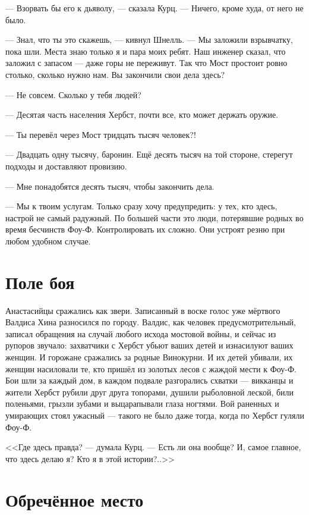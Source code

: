 --- Взорвать бы его к дьяволу, --- сказала Курц.
--- Ничего, кроме худа, от него не было.

--- Знал, что ты это скажешь, --- кивнул Шнелль.
--- Мы заложили взрывчатку, пока шли.
Места знаю только я и пара моих ребят.
Наш инженер сказал, что заложил с запасом --- даже горы не переживут.
Так что Мост простоит ровно столько, сколько нужно нам.
Вы закончили свои дела здесь?

--- Не совсем.
Сколько у тебя людей?

--- Десятая часть населения Хербст, почти все, кто может держать оружие.

--- Ты перевёл через Мост тридцать тысяч человек?!

--- Двадцать одну тысячу, баронин.
Ещё десять тысяч на той стороне, стерегут подходы и доставляют провизию.

--- Мне понадобятся десять тысяч, чтобы закончить дела.

--- Мы к твоим услугам.
Только сразу хочу предупредить: у тех, кто здесь, настрой не самый радужный.
По большей части это люди, потерявшие родных во время бесчинств Фоу-Ф.
Контролировать их сложно.
Они устроят резню при любом удобном случае.

\section{Поле боя}

Анастасийцы сражались как звери.
Записанный в воске голос уже мёртвого Валдиса Хина разносился по городу.
Валдис, как человек предусмотрительный, записал обращения на случай любого исхода мостовой войны, и сейчас из рупоров звучало: захватчики с Хербст убьют ваших детей и изнасилуют ваших женщин.
И горожане сражались за родные Винокурни.
И их детей убивали, их женщин насиловали те, кто пришёл из золотых лесов с жаждой мести к Фоу-Ф.
Бои шли за каждый дом, в каждом подвале разгорались схватки --- викканцы и жители Хербст рубили друг друга топорами, душили рыболовной леской, били поленьями, грызли зубами и выцарапывали глаза ногтями.
Вой раненных и умирающих стоял ужасный --- такого не было даже тогда, когда по Хербст гуляли Фоу-Ф.

<<Где здесь правда? --- думала Курц.
--- Есть ли она вообще?
И, самое главное, что здесь делаю я?
Кто я в этой истории?..>>

\section{Обречённое место}

